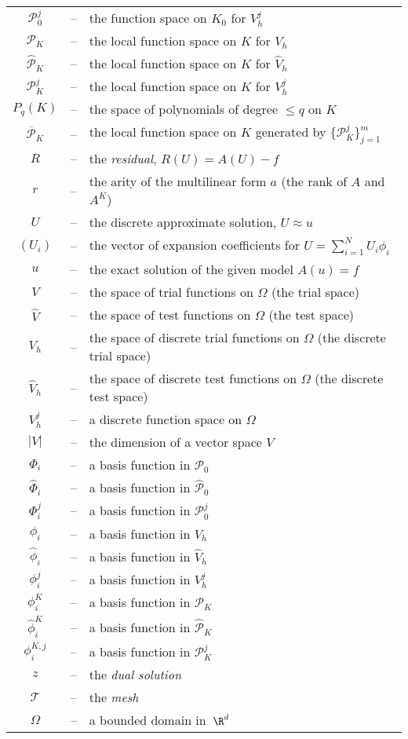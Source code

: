 \begin{longtable}{ccl}
    $\mathcal{P}_0^j$ &--&
    the function space on $K_0$ for $V_h^j$ \\
    $\mathcal{P}_K$ &--&
    the local function space on $K$ for $V_h$ \\
    $\hat{\mathcal{P}}_K$ &--&
    the local function space on $K$ for $\hat{V}_h$ \\
    $\mathcal{P}_K^j$ &--&
    the local function space on $K$ for $V_h^j$ \\
    $P_q(K)$ &--&
    the space of polynomials of degree $\leq q$ on $K$ \\
    $\overline{\mathcal{P}}_K$ &--&
    the local function space on $K$ generated by $\{\mathcal{P}_K^j\}_{j=1}^m$ \\
    $R$ &--&
    the \emph{residual}, $R(U) = A(U) - f$ \\
    $r$ &--&
    the arity of the multilinear form $a$ (the rank of $A$ and $A^K$) \\
    $U$ &--&
    the discrete approximate solution, $U \approx u$ \\
    $(U_i)$ &--&
    the vector of expansion coefficients for $U = \sum_{i=1}^N U_i \phi_i$ \\
    $u$ &--&
    the exact solution of the given model $A(u) = f$ \\
    $V$ &--&
    the space of trial functions on $\Omega$ (the trial space) \\
    $\hat{V}$ &--&
    the space of test functions on $\Omega$ (the test space) \\
    $V_h$ &--&
    the space of discrete trial functions on $\Omega$ (the discrete trial space) \\
    $\hat{V}_h$ &--&
    the space of discrete test functions on $\Omega$ (the discrete test space) \\
    $V_h^j$ &--&
    a discrete function space on $\Omega$ \\  
    $|V|$ &--&
    the dimension of a vector space $V$ \\
    $\Phi_i$ &--&
    a basis function in $\mathcal{P}_0$ \\
    $\hat{\Phi}_i$ &--&
    a basis function in $\hat{\mathcal{P}}_0$ \\
    $\Phi_i^j$ &--&
    a basis function in $\mathcal{P}_0^j$ \\
    $\phi_i$ &--&
    a basis function in $V_h$ \\
    $\hat{\phi}_i$ &--&
    a basis function in $\hat{V}_h$ \\
    $\phi_i^j$ &--&
    a basis function in $V_h^j$ \\
    $\phi_i^K$ &--&
    a basis function in $\mathcal{P}_K$ \\
    $\hat{\phi}_i^K$ &--&
    a basis function in $\hat{\mathcal{P}}_K$ \\
    $\phi_i^{K,j}$ &--&
    a basis function in $\mathcal{P}_K^j$ \\
    $z$ &--&
    the \emph{dual solution} \\
    $\mathcal{T}$ &--&
    the \emph{mesh} \\
    $\Omega$ &--&
    a bounded domain in~$\R^d$ \\
  \end{longtable}
\linespread{1.0}
